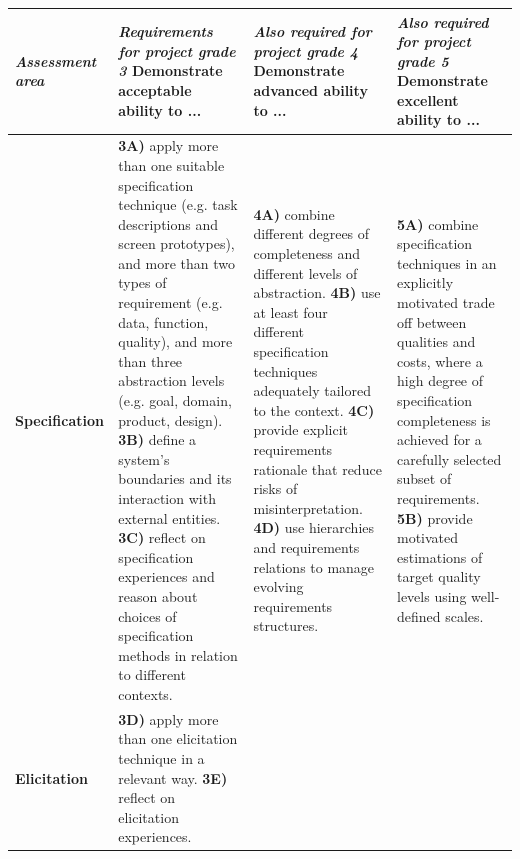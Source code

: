 \documentclass[10pt,a4paper]{article}
\begin{document}
\newpage


\begin{table}
\begin{adjustbox}{width=1.05\textwidth}
\begin{tabular}{| p{2.3cm} |p{5.5cm} | p{5.0cm} | p{5.7cm} |}
\hline
{\it Assessment area} & {\it Requirements for project grade {\bf 3}} \newline Demonstrate {\bf acceptable} ability to ... & {\it Also required for project grade {\bf 4}} \newline Demonstrate {\bf advanced} ability to ...& {\it Also required for project grade {\bf 5}} \newline Demonstrate {\bf excellent} ability to ... \\
\hline
\hline
{\bf Specification} & 
	{\bf 3A)} apply more than one suitable specification technique (e.g. task descriptions and screen prototypes), and more than two types of requirement (e.g. data, function, quality), and more than three abstraction levels (e.g. goal, domain, product, design). \newline
	{\bf 3B)} define a system's boundaries and its interaction with external entities. \newline
	{\bf 3C)} reflect on specification experiences and reason about choices of specification methods in relation to different contexts. & 
	{\bf 4A)} combine different degrees of completeness and different levels of abstraction. \newline
	{\bf 4B)} use at least four different specification techniques adequately tailored to the context. \newline
	{\bf 4C)} provide explicit requirements rationale that reduce risks of misinterpretation. \newline
	{\bf 4D)} use hierarchies and requirements relations to manage evolving requirements structures. &
	{\bf 5A)} combine specification techniques in an explicitly motivated trade off between qualities and costs, where a high degree of specification completeness is achieved for a carefully selected subset of requirements. 	\newline
	{\bf 5B)} provide motivated estimations of target quality levels using well-defined scales. 
\\ \hline

{\bf Elicitation}  & 
	{\bf 3D)} apply more than one elicitation technique in a relevant way. \newline
	{\bf 3E)} reflect on elicitation experiences. &
	

\end{tabular}
\end{adjustbox}
\end{table}
\end{document}
